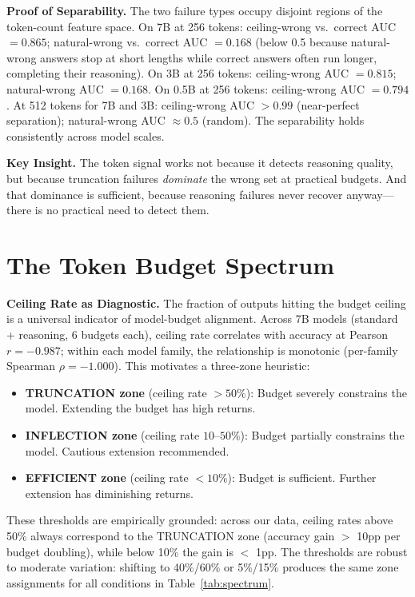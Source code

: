 \documentclass{article}
\begin{document}
\textbf{Proof of Separability.}
The two failure types occupy disjoint regions of the token-count feature space. On 7B at 256 tokens: ceiling-wrong vs.\ correct AUC $= 0.865$; natural-wrong vs.\ correct AUC $= 0.168$ (below 0.5 because natural-wrong answers stop at short lengths while correct answers often run longer, completing their reasoning). On 3B at 256 tokens: ceiling-wrong AUC $= 0.815$; natural-wrong AUC $= 0.168$. On 0.5B at 256 tokens: ceiling-wrong AUC $= 0.794$. At 512 tokens for 7B and 3B: ceiling-wrong AUC $> 0.99$ (near-perfect separation); natural-wrong AUC $\approx 0.5$ (random). The separability holds consistently across model scales.

\textbf{Key Insight.}
The token signal works not because it detects reasoning quality, but because truncation failures \emph{dominate} the wrong set at practical budgets. And that dominance is sufficient, because reasoning failures never recover anyway---there is no practical need to detect them.

\section{The Token Budget Spectrum}

\textbf{Ceiling Rate as Diagnostic.}
The fraction of outputs hitting the budget ceiling is a universal indicator of model-budget alignment. Across 7B models (standard + reasoning, 6 budgets each), ceiling rate correlates with accuracy at Pearson $r = -0.987$; within each model family, the relationship is monotonic (per-family Spearman $\rho = -1.000$). This motivates a three-zone heuristic:

\begin{itemize}
    \item \textbf{TRUNCATION zone} (ceiling rate $> 50\%$): Budget severely constrains the model. Extending the budget has high returns.
    \item \textbf{INFLECTION zone} (ceiling rate $10$--$50\%$): Budget partially constrains the model. Cautious extension recommended.
    \item \textbf{EFFICIENT zone} (ceiling rate $< 10\%$): Budget is sufficient. Further extension has diminishing returns.
\end{itemize}

These thresholds are empirically grounded: across our data, ceiling rates above 50\% always correspond to the TRUNCATION zone (accuracy gain $>$ 10pp per budget doubling), while below 10\% the gain is $<$ 1pp. The thresholds are robust to moderate variation: shifting to 40\%/60\% or 5\%/15\% produces the same zone assignments for all conditions in Table~\ref{tab:spectrum}.
\end{document}
